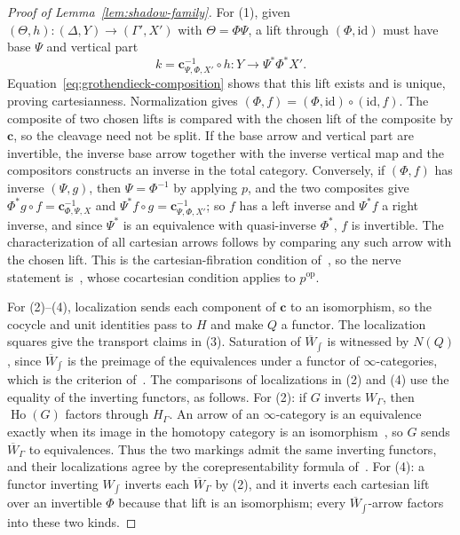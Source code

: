 \documentclass[11pt,letterpaper,twoside]{article}
\theoremstyle{plain}
\theoremstyle{definition}
\theoremstyle{remark}
\let\cite\citep
\begin{document}
\begin{proof}[Proof of Lemma~\ref{lem:shadow-family}]
For (1), given \((\Theta,h):(\Delta,Y)\to(\Gamma',X')\) with \(\Theta=\Phi\Psi\), a lift through \((\Phi,\mathrm{id})\) must have base \(\Psi\) and vertical part
\[
 k=\mathbf c_{\Psi,\Phi,X'}^{-1}\circ h:
 Y\longrightarrow\Psi^*\Phi^*X'.
\]
Equation~\eqref{eq:grothendieck-composition} shows that this lift exists and is unique, proving cartesianness.  Normalization gives \((\Phi,f)=(\Phi,\mathrm{id})\circ(\mathrm{id},f)\).  The composite of two chosen lifts is compared with the chosen lift of the composite by \(\mathbf c\), so the cleavage need not be split.  If the base arrow and vertical part are invertible, the inverse base arrow together with the inverse vertical map and the compositors constructs an inverse in the total category.  Conversely, if \((\Phi,f)\) has inverse \((\Psi,g)\), then \(\Psi=\Phi^{-1}\) by applying \(p\), and the two composites give \(\Phi^*g\circ f=\mathbf c^{-1}_{\Phi,\Psi,X}\) and \(\Psi^*f\circ g=\mathbf c^{-1}_{\Psi,\Phi,X'}\); so \(f\) has a left inverse and \(\Psi^*f\) a right inverse, and since \(\Psi^*\) is an equivalence with quasi-inverse \(\Phi^*\), \(f\) is invertible.  The characterization of all cartesian arrows follows by comparing any such arrow with the chosen lift.  This is the cartesian-fibration condition of~\cite[Tag~01RN]{kerodon}, so the nerve statement is~\cite[Tag~01UB]{kerodon}, whose cocartesian condition applies to \(p^{\mathrm{op}}\).

For (2)--(4), localization sends each component of \(\mathbf c\) to an isomorphism, so the cocycle and unit identities pass to \(H\) and make \(Q\) a functor.  The localization squares give the transport claims in (3).  Saturation of \(\overline W_{\int}\) is witnessed by \(N(Q)\), since \(\overline W_{\int}\) is the preimage of the equivalences under a functor of \(\infty\)-categories, which is the criterion of~\cite[\S1.1.2]{hinich2016}.  The comparisons of localizations in (2) and (4) use the equality of the inverting functors, as follows.  For (2): if \(G\) inverts \(W_\Gamma\), then \(\operatorname{Ho}(G)\) factors through \(H_\Gamma\).  An arrow of an \(\infty\)-category is an equivalence exactly when its image in the homotopy category is an isomorphism~\cite[\S1.1.2]{hinich2016}, so \(G\) sends \(\overline W_\Gamma\) to equivalences.  Thus the two markings admit the same inverting functors, and their localizations agree by the corepresentability formula of~\cite[\S1.1.2]{hinich2016}.  For (4): a functor inverting \(W_{\int}\) inverts each \(\overline W_\Gamma\) by (2), and it inverts each cartesian lift over an invertible \(\Phi\) because that lift is an isomorphism; every \(\overline W_{\int}\)-arrow factors into these two kinds.
\end{proof}
\end{document}

